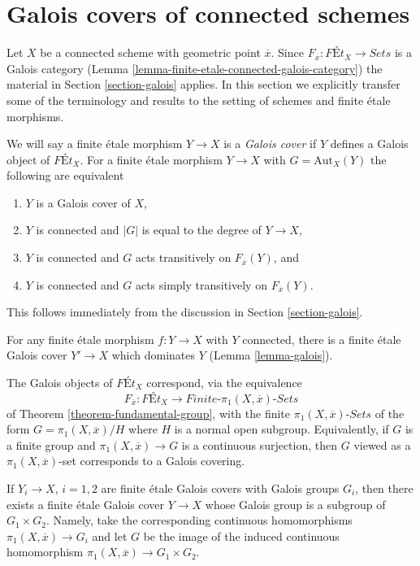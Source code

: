 \section{Galois covers of connected schemes}
\label{section-finite-etale-under-galois}

\noindent
Let $X$ be a connected scheme with geometric point $\overline{x}$.
Since $F_{\overline{x}} : \textit{F\'Et}_X \to \textit{Sets}$ is a
Galois category (Lemma \ref{lemma-finite-etale-connected-galois-category})
the material in Section \ref{section-galois} applies.
In this section we explicitly transfer some of the terminology
and results to the setting of schemes and finite \'etale morphisms.

\medskip\noindent
We will say a finite \'etale morphism $Y \to X$ is a
{\it Galois cover} if $Y$ defines a Galois object of
$\textit{F\'Et}_X$.
For a finite \'etale morphism $Y \to X$ with $G = \text{Aut}_X(Y)$
the following are equivalent
\begin{enumerate}
\item $Y$ is a Galois cover of $X$,
\item $Y$ is connected and $|G|$ is equal to the degree of $Y \to X$,
\item $Y$ is connected and $G$ acts transitively on $F_{\overline{x}}(Y)$, and
\item $Y$ is connected and $G$ acts simply transitively on
$F_{\overline{x}}(Y)$.
\end{enumerate}
This follows immediately from the discussion in Section \ref{section-galois}.

\medskip\noindent
For any finite \'etale morphism $f : Y \to X$ with $Y$ connected,
there is a finite \'etale Galois cover $Y' \to X$ which dominates $Y$
(Lemma \ref{lemma-galois}).

\medskip\noindent
The Galois objects of $\textit{F\'Et}_X$ correspond, via the equivalence
$$
F_{\overline{x}} : \textit{F\'Et}_X \to
\textit{Finite-}\pi_1(X, \overline{x})\textit{-Sets}
$$
of Theorem \ref{theorem-fundamental-group},
with the finite $\pi_1(X, \overline{x})\textit{-Sets}$
of the form $G = \pi_1(X, \overline{x})/H$ where $H$ is a
normal open subgroup. Equivalently, if $G$ is a finite group
and $\pi_1(X, \overline{x}) \to G$ is a continuous surjection,
then $G$ viewed as a $\pi_1(X, \overline{x})$-set corresponds
to a Galois covering.

\medskip\noindent
If $Y_i \to X$, $i = 1, 2$ are finite \'etale Galois covers
with Galois groups $G_i$, then there exists a finite \'etale
Galois cover $Y \to X$ whose Galois group is a subgroup of
$G_1 \times G_2$. Namely, take the corresponding continuous
homomorphisms $\pi_1(X, \overline{x}) \to G_i$ and
let $G$ be the image of the induced continuous homomorphism
$\pi_1(X, \overline{x}) \to G_1 \times G_2$.









